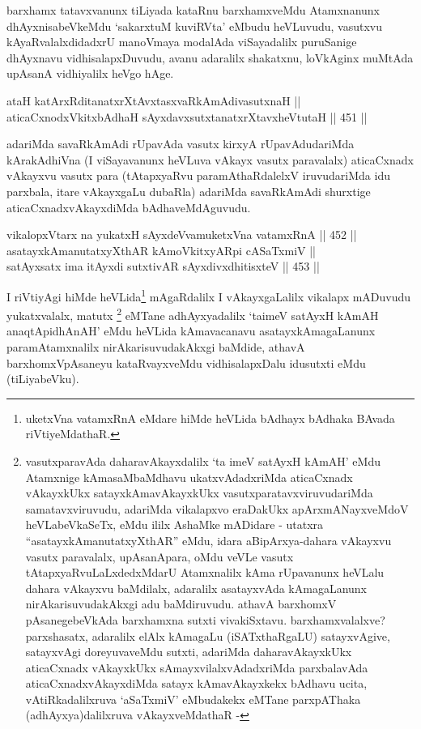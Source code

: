 \begin{artha}
barxhamx
tatavxvanunx tiLiyada kataRnu barxhamxveMdu
Atamxnanunx dhAyxnisabeVkeMdu `sakarxtuM kuviRVta' eMbudu heVLuvudu,
vasutxvu kAyaRvalalxdidadxrU manoVmaya modalAda viSayadalilx
puruSanige dhAyxnavu vidhisalapxDuvudu, avanu adaralilx shakatxnu,
loVkAginx muMtAda upAsanA vidhiyalilx heVgo hAge.
\end{artha}

\begin{shl}
ataH katArxRditanatxrXtAvxtasxvaRkAmAdivasutxnaH || \\
aticaCxnodxVkitxbAdhaH sAyxdavxsutxtanatxrXtavxheVtutaH \hfill || 451 ||  
\end{shl}

\begin{artha}
adariMda savaRkAmAdi rUpavAda vasutx kirxyA rUpavAdudariMda
kArakAdhiVna (I viSayavanunx heVLuva vAkayx vasutx paravalalx)
aticaCxnadx vAkayxvu vasutx para (tAtapxyaRvu paramAthaRdalelxV
iruvudariMda idu parxbala, itare vAkayxgaLu dubaRla) adariMda
savaRkAmAdi shurxtige aticaCxnadxvAkayxdiMda bAdhaveMdAguvudu.
\end{artha}


\begin{shl}
vikalopxV\s tarx na yukatxH sAyxdeVvamuketxVna vatamxRnA || 452 || \\
asatayxkAmanutatxyXthAR kAmoVkitxyAR\s pi cASaTxmiV || \\
satAyxsatx ima itAyxdi sutxtivAR sAyxdivxdhitisxteV \hfill || 453 ||  
\end{shl}

\begin{artha}
I riVtiyAgi hiMde heVLida\footnote{uketxVna vatamxRnA eMdare hiMde
heVLida bAdhayx bAdhaka BAvada riVtiyeMdathaR.} mAgaRdalilx I vAkayxgaLalilx
vikalapx mADuvudu yukatxvalalx, matutx \footnote{vasutxparavAda
daharavAkayxdalilx `ta imeV satAyxH kAmAH' eMdu Atamxnige
kAmasaMbaMdhavu ukatxvAdadxriMda aticaCxnadx vAkayxkUkx
satayxkAmavAkayxkUkx vasutxparatavxviruvudariMda samatavxviruvudu,
adariMda vikalapxvo eraDakUkx apArxmANayxveMdoV heVLabeVkaSeTx, eMdu
ililx AshaMke mADidare - utatxra ``asatayxkAmanutatxyXthAR'' eMdu,
idara aBipArxya-dahara vAkayxvu vasutx paravalalx, upAsanApara, oMdu
veVLe vasutx tAtapxyaRvuLaLxdedxMdarU Atamxnalilx kAma rUpavanunx
heVLalu dahara vAkayxvu baMdilalx, adaralilx asatayxvAda
kAmagaLanunx nirAkarisuvudakAkxgi adu baMdiruvudu. athavA barxhomxV
pAsanegebeVkAda barxhamxna sutxti vivakiSxtavu. barxhamxvalalxve?
parxshasatx, adaralilx elAlx kAmagaLu (iSATxthaRgaLU) satayxvAgive,
satayxvAgi doreyuvaveMdu sutxti, adariMda daharavAkayxkUkx
aticaCxnadx vAkayxkUkx sAmayxvilalxvAdadxriMda parxbalavAda
aticaCxnadxvAkayxdiMda satayx kAmavAkayxkekx bAdhavu ucita,
vAtiRkadalilxruva `aSaTxmiV' eMbudakekx eMTane parxpAThaka
(adhAyxya)dalilxruva vAkayxveMdathaR -} eMTane
adhAyxyadalilx `taimeV satAyxH kAmAH anaqtApidhAnAH' eMdu heVLida
kAmavacanavu asatayxkAmagaLanunx paramAtamxnalilx nirAkarisuvudakAkxgi
baMdide, athavA barxhomxVpAsaneyu kataRvayxveMdu vidhisalapxDalu
idusutxti eMdu (tiLiyabeVku).
\end{artha}

